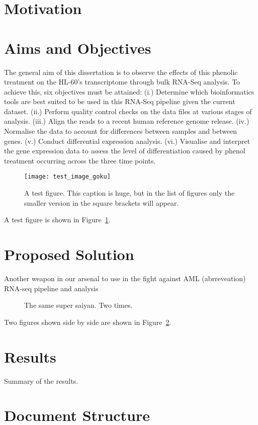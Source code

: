 \section{Motivation} 


\section{Aims and Objectives} 

The general aim of this dissertation is to observe the 
effects of this phenolic treatment on the HL-60’s
transcriptome through bulk RNA-Seq analysis. To achieve
this, six objectives must be attained:
(i.) Determine which bioinformatics tools are best 
suited to be used in this RNA-Seq pipeline given the 
current dataset.
(ii.) Perform quality control checks on the data files at 
various stages of analysis.
(iii.) Align the reads to a recent human reference genome 
release.
(iv.) Normalise the data to account for differences 
between samples and between genes.
(v.) Conduct differential expression analysis.
(vi.) Visualise and interpret the gene expression data to 
assess the level of differentiation caused by phenol 
treatment occurring across the three time points.



\begin{figure}[ht!] %
  \centering
  \texttt{[image: test\_image\_goku]}
  \caption[This is the short caption for List of Figures]{A test figure.  This caption is huge, but in the list of figures only the smaller version in the square brackets will appear.}
  \label{fig:test1}
\end{figure}

A test figure is shown in Figure~\ref{fig:test1}.

\section{Proposed Solution} 
Another weapon in our arsenal to use in the fight against AML (abrreveation)
RNA-seq pipeline and analysis

\begin{figure}[!ht]
    \centering
    \qquad
    \caption[Short Caption]{The same super saiyan. Two times.} 
    \label{fig:test2}
\end{figure}

Two figures shown side by side are shown in Figure~\ref{fig:test2}.
\section{Results}
Summary of the results.


\section{Document Structure}
